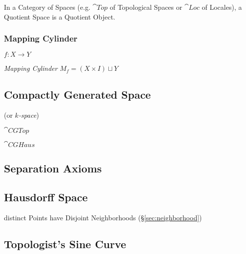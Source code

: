 In a Category of Spaces (e.g. $\cat{Top}$ of Topological Spaces or
$\cat{Loc}$ of Locales), a Quotient Space is a Quotient Object.



\subsubsection{Mapping Cylinder}\label{sec:mapping_cylinder}

$f : X \rightarrow Y$

\emph{Mapping Cylinder} $M_f = (X \times I) \sqcup Y$



\subsection{Compactly Generated Space}\label{sec:compactly_generated}

(or \emph{$k$-space})

$\cat{CGTop}$

$\cat{CGHaus}$



\subsection{Separation Axioms}\label{sec:separation_axioms}

\subsection{Hausdorff Space}\label{sec:hausdorff_space}

distinct Points have Disjoint Neighborhoods (\S\ref{sec:neighborhood})



\subsection{Topologist's Sine Curve}\label{sec:topologists_sine}

